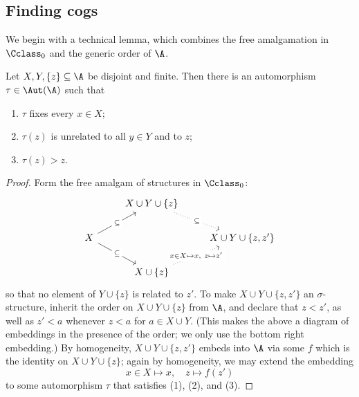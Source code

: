 \subsection{Finding cogs}\label{subsec:finding-cogs}
We begin with a technical lemma, which combines the free amalgamation in $\Cclass_0$ and the generic order of $\A$.
\begin{lemma}\label{lem:free-fresh}
    Let $X, Y, \{z\} \subseteq \A$ be disjoint and finite.
    Then there is an automorphism $\tau \in \Aut(\A)$ such that
    \begin{enumerate}
        \item $\tau$ fixes every $x \in X$;
        \item $\tau(z)$ is unrelated to all $y \in Y$ and to $z$;
        \item $\tau(z) > z$.
    \end{enumerate}
\end{lemma}
\begin{proof}
    Form the free amalgam of structures in ${\Cclass}_0$:
\[\begin{tikzcd}
	& {X \cup Y \cup \{z\}} & \\
	X && {X \cup Y \cup \{z, z'\}} \\
	& {X \cup \{z\}}
	\arrow["\subseteq"{description}, dotted, from=1-2, to=2-3]
	\arrow["\subseteq"{description}, from=2-1, to=1-2]
	\arrow["\subseteq"{description}, from=2-1, to=3-2]
	\arrow["{x \in X \mapsto x,\ z \mapsto z'}"{description}, dotted, from=3-2, to=2-3]
\end{tikzcd}\]
    so that no element of $Y \cup \{z\}$ is related to $z'$.
    To make $X \cup Y \cup \{z, z'\}$ an $\sigma$-structure, 
    inherit the order on $X \cup Y \cup \{z\}$ from $\A$,
    and declare that $z < z'$, as well as $z' < a$ whenever $z<a$ for $a\in X \cup Y$. (This makes the above a diagram of embeddings in the presence of the order; we only use the bottom right embedding.)
    By homogeneity, $X \cup Y \cup \{z, z'\}$ embeds into $\A$ via some $f$ which is the identity on $X \cup Y \cup \{z\}$;
    again by homogeneity, we may extend the embedding \[ 
        x \in X \mapsto x, \quad z \mapsto f(z')
    \] to some automorphism $\tau$ that satisfies (1), (2), and (3).
\end{proof}

